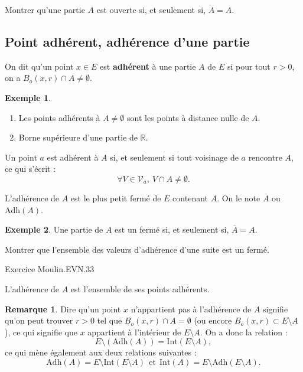 \documentclass[french]{article}
\newcommand{\R}{\mathbb{R}}
\theoremstyle{plain}
\theoremstyle{definition}
\newtheorem*{ex}{Exemple}
\newtheorem*{rmq}{Remarque}
\theoremstyle{remark}
\begin{document}
\begin{exo}
	Montrer qu'une partie $A$ est ouverte si, et seulement si,  $\mathring{A}=A$.
\end{exo}

\subsection{Point adhérent, adhérence d'une partie}

\begin{dfn}
	On dit qu'un point $x\in E$ est \textbf{adhérent} à une partie $A$ de $E$ si pour tout $r>0$, on a $B_o(x,r)\cap A\ne\emptyset$.
\end{dfn}

\begin{ex}
	\begin{enumerate}
		\item Les points adhérents à $A\ne\emptyset$ sont les points à distance nulle de $A$.
		\item Borne supérieure d'une partie de $\R$.
	\end{enumerate}
\end{ex}

\begin{prop}%
	Un point $a$ est adhérent à $A$ si, et seulement si tout voisinage de $a$ rencontre $A$, ce qui s'écrit : $$\forall V\in\mathcal{V}_a,\ V\cap A\ne\emptyset.$$
\end{prop}

\begin{dfn}
	L'adhérence de $A$ est le plus petit fermé de $E$ contenant $A$. On le note $\overline{A}$ ou $\text{Adh}(A)$.
\end{dfn}

\begin{ex}
	Une partie de $A$ est un fermé si, et seulement si, $\overline{A}=A$.
\end{ex}

\begin{exo}
	Montrer que l'ensemble des valeurs d'adhérence d'une suite est un fermé.
\end{exo}

Exercice Moulin.EVN.33

\begin{prop}%
	L'adhérence de $A$ est l'ensemble de ses points adhérents.
\end{prop}

\begin{rmq}
	Dire qu'un point $x$ n'appartient pas à l'adhérence de $A$ signifie qu'on peut trouver $r>0$ tel que $B_o(x,r)\cap A=\emptyset$ (ou encore $B_o(x,r)\subset E\setminus A$), ce qui signifie que $x$ appartient à l'intérieur de $E\setminus A$. On a donc la relation : $$E\setminus\left(\text{Adh}(A)\right)=\text{Int}(E\setminus A),$$
	ce qui mène également aux deux relations suivantes : $$\text{Adh}(A)=E\setminus\text{Int}(E\setminus A)\ \ \text{et}\ \ \text{Int}(A)=E\setminus\text{Adh}(E\setminus A).$$
\end{rmq}
\end{document}
